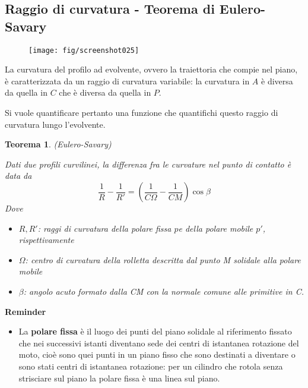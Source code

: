 \documentclass[a4paper, 15pt]{article}
\newtheorem*{thm}{Teorema}
\begin{document}
\subsection{Raggio di curvatura - Teorema di Eulero-Savary}
	\begin{adjustwidth}{2in}{}
		\begin{figure}[H]
			\centering
			\texttt{[image: fig/screenshot025]}
			\label{fig:screenshot025}
		\end{figure}	
		La curvatura del profilo ad evolvente, ovvero la traiettoria che compie nel piano, è caratterizzata da un raggio di curvatura variabile: la curvatura in $A$ è diversa da quella in $C$ che è diversa da quella in $P$.
		
		Si vuole quantificare pertanto una funzione che quantifichi questo raggio di curvatura lungo l'evolvente. \newline
		
		\begin{thm}(Eulero-Savary)
		
			Dati due profili curvilinei, la differenza fra le curvature nel punto di contatto è data da
\begin{equation}\label{eq:el.sav}
				\dfrac{1}{R} - \dfrac{1}{R'} = \left(\dfrac{1}{C\Omega} - \dfrac{1}{CM}\right)\cos\beta
\end{equation}
			Dove
			\begin{itemize}
				\item \textbf{$R,R'$}: raggi di curvatura della polare fissa  \textbf{$p$}e della polare mobile \textbf{$p'$}, rispettivamente
				\item \textbf{$\Omega$}: centro di curvatura della rolletta descritta dal punto M solidale alla polare mobile
				\item \textbf{$\beta$}: angolo acuto formato dalla CM con la normale comune alle primitive in C.
			\end{itemize}
		\end{thm} 
		
		\textbf{Reminder}
		\begin{itemize}			
		\item La \textbf{polare fissa} è il luogo dei punti del piano solidale al riferimento fissato che nei successivi istanti diventano sede dei centri di istantanea rotazione del moto, cioè  sono quei punti in un piano fisso che sono destinati a diventare o sono stati centri di istantanea rotazione: per un cilindro che rotola senza strisciare sul piano la polare fissa è una linea sul piano.
		

\end{itemize}
\end{adjustwidth}
\end{document}
